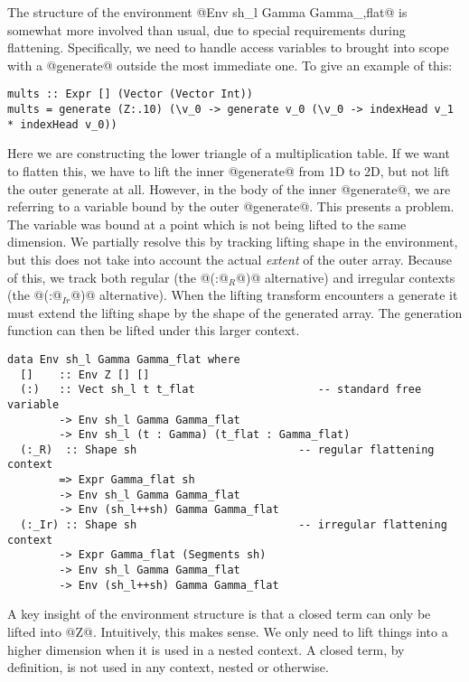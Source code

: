 The structure of the environment @Env sh_l  Gamma  Gamma_,flat@ is somewhat more involved than usual, due to special requirements during flattening. Specifically, we need to handle access variables to brought into scope with a @generate@ outside the most immediate one. To give an example of this:
%
\begin{lstlisting}
mults :: Expr [] (Vector (Vector Int))
mults = generate (Z:.10) (\v_0 -> generate v_0 (\v_0 -> indexHead v_1 * indexHead v_0))
\end{lstlisting}
%
Here we are constructing the lower triangle of a multiplication table. If we want to flatten this, we have to lift the inner @generate@ from 1D to 2D, but not lift the outer generate at all. However, in the body of the inner @generate@, we are referring to a variable bound by the outer @generate@. This presents a problem. The variable was bound at a point which is not being lifted to the same dimension. We partially resolve this by tracking lifting shape in the environment, but this does not take into account the actual \emph{extent} of the outer array. Because of this, we track both regular (the @(:@$_R$@)@ alternative) and irregular contexts (the @(:@$_{Ir}$@)@ alternative). When the lifting transform encounters a generate it must extend the lifting shape by the shape of the generated array. The generation function can then be lifted under this larger context.
%
\begin{lstlisting}[style=ndp]
data Env sh_l Gamma Gamma_flat where
  []    :: Env Z [] []
  (:)   :: Vect sh_l t t_flat                   -- standard free variable
        -> Env sh_l Gamma Gamma_flat
        -> Env sh_l (t : Gamma) (t_flat : Gamma_flat)
  (:_R)  :: Shape sh                         -- regular flattening context
        => Expr Gamma_flat sh
        -> Env sh_l Gamma Gamma_flat
        -> Env (sh_l++sh) Gamma Gamma_flat
  (:_Ir) :: Shape sh                         -- irregular flattening context
        -> Expr Gamma_flat (Segments sh)
        -> Env sh_l Gamma Gamma_flat
        -> Env (sh_l++sh) Gamma Gamma_flat
\end{lstlisting}

A key insight of the environment structure is that a closed term can only be lifted into @Z@. Intuitively, this makes sense. We only need to lift things into a higher dimension when it is used in a nested context. A closed term, by definition, is not used in any context, nested or otherwise.

